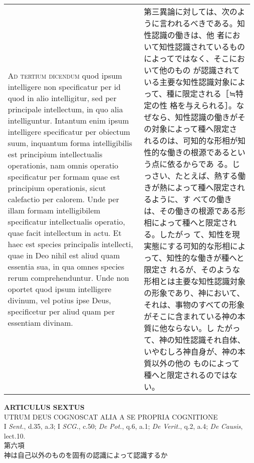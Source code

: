 \documentclass[10pt]{jsarticle} %
\begin{document}
\begin{longtable}{p{21em}p{21em}}
\\


{\scshape Ad tertium dicendum} quod ipsum intelligere non specificatur
per id quod in alio intelligitur, sed per principale intellectum, in
quo alia intelliguntur. Intantum enim ipsum intelligere specificatur
per obiectum suum, inquantum forma intelligibilis est principium
intellectualis operationis, nam omnis operatio specificatur per formam
quae est principium operationis, sicut calefactio per calorem. Unde
per illam formam intelligibilem specificatur intellectualis operatio,
quae facit intellectum in actu. Et haec est species principalis
intellecti, quae in Deo nihil est aliud quam essentia sua, in qua
omnes species rerum comprehenduntur. Unde non oportet quod ipsum
intelligere divinum, vel potius ipse Deus, specificetur per aliud quam
per essentiam divinam.


&

第三異論に対しては、次のように言われるべきである。知性認識の働きは、他
者において知性認識されているものによってではなく、そこにおいて他のもの
が認識されている主要な知性認識対象によって、種に限定される［≒特定の性
格を与えられる］。なぜなら、知性認識の働きがその対象によって種へ限定さ
れるのは、可知的な形相が知性的な働きの根源であるという点に依るからであ
る。じっさい、たとえば、熱する働きが熱によって種へ限定されるように、す
べての働きは、その働きの根源である形相によって種へと限定される。したがっ
て、知性を現実態にする可知的な形相によって、知性的な働きが種へと限定さ
れるが、そのような形相とは主要な知性認識対象の形象であり、神において、
それは、事物のすべての形象がそこに含まれている神の本質に他ならない。し
たがって、神の知性認識それ自体、いやむしろ神自身が、神の本質以外の他の
ものによって種へと限定されるのではない。


\end{longtable}
\newpage


\begin{center}
{\Large {\bf ARTICULUS SEXTUS}}\\ {\large UTRUM DEUS COGNOSCAT ALIA A
SE PROPRIA COGNITIONE}\\ {\footnotesize I {\itshape Sent.}, d.35,
a.3; I {\itshape SCG.}, c.50; {\itshape De Pot.}, q.6, a.1;
{\itshape De Verit.}, q.2, a.4; {\itshape De Causis}, lect.10.}\\
{\Large 第六項\\神は自己以外のものを固有の認識によって認識するか}
\end{center}
\end{document}
